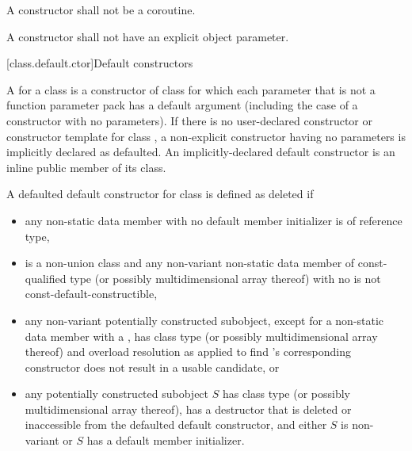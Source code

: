 \pnum
A constructor shall not be a coroutine.

\pnum
A constructor shall not have an explicit object parameter.

[class.default.ctor]{Default constructors}

\pnum
{}%
%
A  for a class 
is a constructor of class 
for which each parameter
that is not a function parameter pack
has a default argument
(including the case of a constructor with no parameters).
%
If there is no user-declared constructor or constructor template for class
,
a non-explicit constructor having no parameters is implicitly declared
as defaulted.
An implicitly-declared default constructor is an
inline public member of its class.

\pnum
A defaulted default constructor for class  is defined as deleted if
\begin{itemize}
\item any non-static data member with no default member initializer is
of reference type,

\item {} is a non-union class and
any non-variant non-static data member of const-qualified type
(or possibly multidimensional array thereof)
with no 
is not const-default-constructible,

\item any non-variant potentially constructed subobject, except for a non-static data member
with a ,
has class type  (or possibly multidimensional array thereof)
and overload resolution
as applied to find 's corresponding constructor
does not result in a usable candidate, or

\item any potentially constructed subobject $S$ has
class type  (or possibly multidimensional array thereof),
 has
a destructor that is deleted or inaccessible from the defaulted default
constructor, and
either $S$ is non-variant or $S$ has a default member initializer.
\end{itemize}

